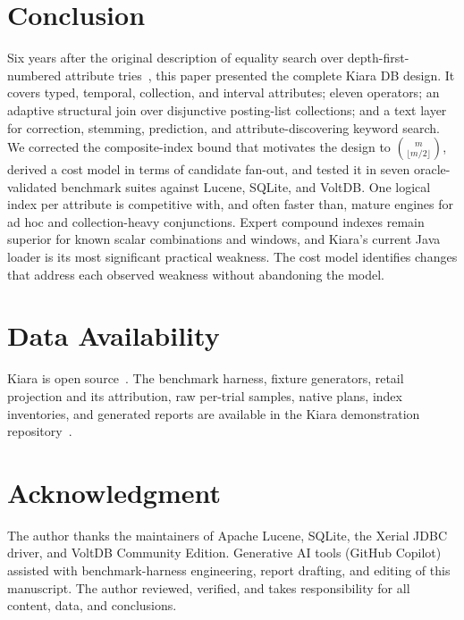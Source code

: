 \section{Conclusion}
\label{sec:conclusion}
Six years after the original description of equality search over depth-first-numbered attribute tries~\cite{kapoor2020efficient}, this paper presented the complete Kiara DB design. It covers typed, temporal, collection, and interval attributes; eleven operators; an adaptive structural join over disjunctive posting-list collections; and a text layer for correction, stemming, prediction, and attribute-discovering keyword search. We corrected the composite-index bound that motivates the design to $\binom{m}{\lfloor m/2\rfloor}$, derived a cost model in terms of candidate fan-out, and tested it in seven oracle-validated benchmark suites against Lucene, SQLite, and VoltDB. One logical index per attribute is competitive with, and often faster than, mature engines for ad hoc and collection-heavy conjunctions. Expert compound indexes remain superior for known scalar combinations and windows, and Kiara's current Java loader is its most significant practical weakness. The cost model identifies changes that address each observed weakness without abandoning the model.

\section*{Data Availability}
Kiara is open source~\cite{kiara2026software}. The benchmark harness, fixture generators, retail projection and its attribution, raw per-trial samples, native plans, index inventories, and generated reports are available in the Kiara demonstration repository~\cite{kiarademo2026benchmarks}.

\section*{Acknowledgment}
The author thanks the maintainers of Apache Lucene, SQLite, the Xerial JDBC driver, and VoltDB Community Edition. Generative AI tools (GitHub Copilot) assisted with benchmark-harness engineering, report drafting, and editing of this manuscript. The author reviewed, verified, and takes responsibility for all content, data, and conclusions.
